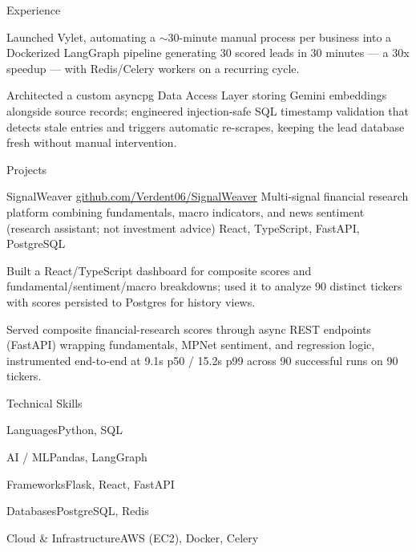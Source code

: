 \documentclass[
	11pt
]{../../../template}
\begin{document}
\begin{rSection}{E}{xperience}
\begin{rSectionEntry}
			\item Launched Vylet, automating a $\sim$30-minute manual process per business into a Dockerized LangGraph pipeline generating 30 scored leads in 30 minutes --- a 30x speedup --- with Redis/Celery workers on a recurring cycle.
			\item Architected a custom asyncpg Data Access Layer storing Gemini embeddings alongside source records; engineered injection-safe SQL timestamp validation that detects stale entries and triggers automatic re-scrapes, keeping the lead database fresh without manual intervention.
		\end{rSectionEntry}

	\end{rSection}

	\begin{rSection}{P}{rojects}
		\begin{rSectionEntry}
			{SignalWeaver}
			{\href{https://github.com/Verdent06/SignalWeaver}{github.com/Verdent06/SignalWeaver}}
			{Multi-signal financial research platform combining fundamentals, macro indicators, and news sentiment (research assistant; not investment advice)}
			{React, TypeScript, FastAPI, PostgreSQL}
			{}

			\item Built a React/TypeScript dashboard for composite scores and fundamental/sentiment/macro breakdowns; used it to analyze 90 distinct tickers with scores persisted to Postgres for history views.
			\item Served composite financial-research scores through async REST endpoints (FastAPI) wrapping fundamentals, MPNet sentiment, and regression logic, instrumented end-to-end at 9.1s p50 / 15.2s p99 across 90 successful runs on 90 tickers.
		\end{rSectionEntry}
	\end{rSection}

	\begin{rSection}{T}{echnical Skills}
		\begin{rSet}{Languages}{Python, SQL}
		\end{rSet}
		\begin{rSet}{AI / ML}{Pandas, LangGraph}
		\end{rSet}
		\begin{rSet}{Frameworks}{Flask, React, FastAPI}
		\end{rSet}
		\begin{rSet}{Databases}{PostgreSQL, Redis}
		\end{rSet}
		\begin{rSet}{Cloud \& Infrastructure}{AWS (EC2), Docker, Celery}
		\end{rSet}
	\end{rSection}
\end{document}
